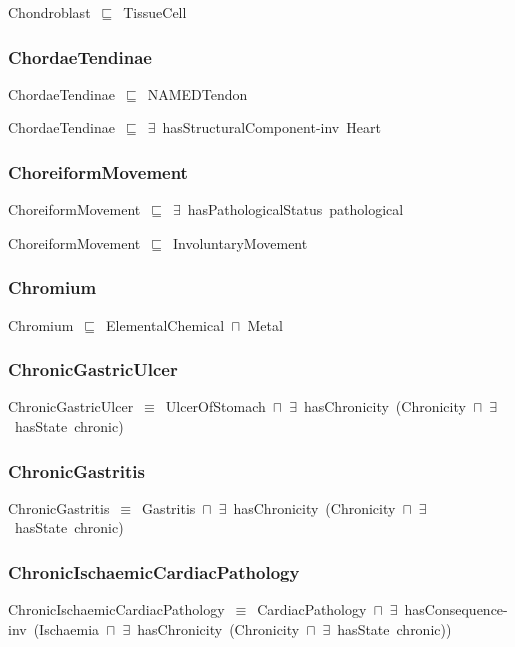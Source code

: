 \documentclass{article}
\begin{document}
Chondroblast~\ensuremath{\sqsubseteq}~TissueCell~

\subsubsection*{ChordaeTendinae}

ChordaeTendinae~\ensuremath{\sqsubseteq}~NAMEDTendon~

ChordaeTendinae~\ensuremath{\sqsubseteq}~\ensuremath{\exists}~hasStructuralComponent-inv~Heart~

\subsubsection*{ChoreiformMovement}

ChoreiformMovement~\ensuremath{\sqsubseteq}~\ensuremath{\exists}~hasPathologicalStatus~pathological~

ChoreiformMovement~\ensuremath{\sqsubseteq}~InvoluntaryMovement~

\subsubsection*{Chromium}

Chromium~\ensuremath{\sqsubseteq}~ElementalChemical~\ensuremath{\sqcap}~Metal~

\subsubsection*{ChronicGastricUlcer}

ChronicGastricUlcer~\ensuremath{\equiv}~UlcerOfStomach~\ensuremath{\sqcap}~\ensuremath{\exists}~hasChronicity~(Chronicity~\ensuremath{\sqcap}~\ensuremath{\exists}~hasState~chronic)

\subsubsection*{ChronicGastritis}

ChronicGastritis~\ensuremath{\equiv}~Gastritis~\ensuremath{\sqcap}~\ensuremath{\exists}~hasChronicity~(Chronicity~\ensuremath{\sqcap}~\ensuremath{\exists}~hasState~chronic)

\subsubsection*{ChronicIschaemicCardiacPathology}

ChronicIschaemicCardiacPathology~\ensuremath{\equiv}~CardiacPathology~\ensuremath{\sqcap}~\ensuremath{\exists}~hasConsequence-inv~(Ischaemia~\ensuremath{\sqcap}~\ensuremath{\exists}~hasChronicity~(Chronicity~\ensuremath{\sqcap}~\ensuremath{\exists}~hasState~chronic))
\end{document}
